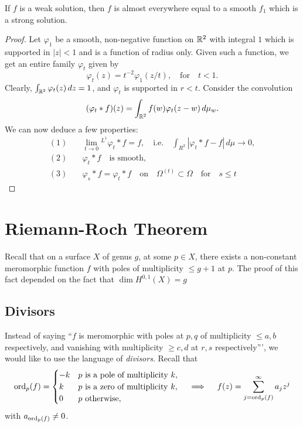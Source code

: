 \documentclass{lkx_paper}
\begin{document}
\begin{lemma}
	If $f$ is a weak solution, then $f$ is almost everywhere equal to a smooth $f_1$ which is a strong solution.
\end{lemma}

\begin{proof}
	Let $\varphi_1$ be a smooth, non-negative function on $\mathbb{R}^2$ with integral $1$ which is supported in $|z|<1$ and is a function of radius only. Given such a function, we get an entire family $\varphi_t$ given by
	\[
		\varphi_t(z) = t^{-2}\varphi_1(z/t),\quad\textrm{for}\quad t < 1.
	\]
	Clearly, $\int_{\mathbb{R}^2} \varphi_t(z)\,dz = 1$, and $\varphi_t$ is supported in $r<t$. Consider the convolution
	\[
		(\varphi_t * f)(z) = \int_{\mathbb{R}^2} f(w)\varphi_t(z-w)\,d\mu_w.
	\]
	We can now deduce a few properties:
	\[
		\begin{aligned}
			(1) & \quad\lim_{t\to 0}\phantom{}^{L^1} \varphi_t * f = f,\quad\textrm{i.e.}\quad \int_{R^2}|\varphi_t * f - f|\,d\mu \to 0, \\
			(2) & \quad \varphi_t * f\quad \textrm{is smooth,}                                                                            \\
			(3) & \quad \varphi_s * f = \varphi_t * f\quad\textrm{on}\quad \Omega^{(t)}\subset \Omega \quad\textrm{for}\quad s\leq t
		\end{aligned}
	\]
\end{proof}

\section{Riemann-Roch Theorem}

Recall that on a surface $X$ of genus $g$, at some $p\in X$, there exists a non-constant meromorphic function $f$ with poles of multiplicity $\leq g+1$ at $p$. The proof of this fact depended on the fact that $\dim H^{0,1}(X)=g$

\subsection{Divisors}

Instead of saying ``$f$ is meromorphic with poles at $p,q$ of multiplicity $\leq a,b$ respectively, and vanishing with multiplicity $\geq c,d$ at $r,s$ respectively''', we would like to use the language of \emph{divisors}.
Recall that
\[\mathrm{ord}_p(f) = \begin{cases}
		-k & p\textrm{ is a pole of multiplicity }k, \\
		k  & p\textrm{ is a zero of multiplicity }k, \\
		0  & p\textrm{ otherwise},
	\end{cases}\quad \implies \quad f(z) = \sum^\infty_{j=\mathrm{ord}_p(f)} a_j z^j\]
with $a_{\mathrm{ord}_p(f)}\neq 0$.
\end{document}

